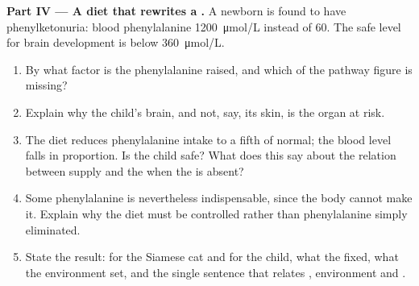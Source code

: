 \begin{problem}
\medskip
\noindent\textbf{Part IV --- A diet that rewrites a .}
A newborn is found to have phenylketonuria: blood phenylalanine
\qty{1200}{\micro mol/L} instead of \num{60}. The safe level for
brain development is below \qty{360}{\micro mol/L}.
\begin{enumerate}[resume]
  \item By what factor is the phenylalanine raised, and which 
        of the pathway figure is missing?
  \item Explain why the child's brain, and not, say, its skin, is the
        organ at risk.
  \item The diet reduces phenylalanine intake to a fifth of normal;
        the blood level falls in proportion. Is the child safe? What
        does this say about the relation between  supply and
        the  when the  is absent?
  \item Some phenylalanine is nevertheless indispensable, since the
        body cannot make it. Explain why the diet must be controlled
        rather than phenylalanine simply eliminated.
  \item State the result: for the Siamese cat and for the child, what
        the  fixed, what the environment set, and the single
        sentence that relates , environment and .
\end{enumerate}
\end{problem}
